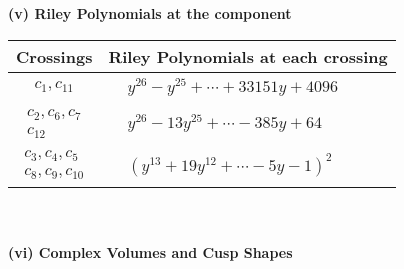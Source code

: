 \documentclass[1p]{elsarticle_modified}
\theoremstyle{definition}
\begin{document}
\newpage\renewcommand{\arraystretch}{1}
\flushleft \textbf{(v) Riley Polynomials at the component}\newline \\
\begin{tabular}{m{50pt}|m{274pt}}
Crossings & \hspace{64pt}Riley Polynomials at each crossing \\
\hline $$\begin{aligned}c_{1},c_{11}\end{aligned}$$&$\begin{aligned}
&y^{26}- y^{25}+\cdots+33151 y+4096
\end{aligned}$\\
\hline $$\begin{aligned}c_{2},c_{6},c_{7}\\c_{12}\end{aligned}$$&$\begin{aligned}
&y^{26}-13 y^{25}+\cdots-385 y+64
\end{aligned}$\\
\hline $$\begin{aligned}c_{3},c_{4},c_{5}\\c_{8},c_{9},c_{10}\end{aligned}$$&$\begin{aligned}
&(y^{13}+19 y^{12}+\cdots-5 y-1)^{2}
\end{aligned}$\\
\hline
\end{tabular}\\~\\
\newpage\flushleft \textbf{(vi) Complex Volumes and Cusp Shapes}
\end{document}

